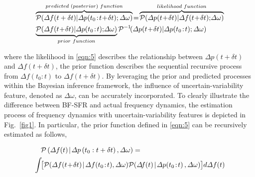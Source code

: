 \documentclass[lettersize,journal]{IEEEtran}
\newenvironment{newsubequations}{\small\begin{subequations}}{\end{subequations}}
\begin{document}
\vspace{-0.10in}
\begin{newsubequations}
	\begin{align}
		 & \overbrace{\mathcal{P}(\varDelta f(t+ \delta t)|\varDelta p(t_0\!:\! t \!+\! \delta t); \varDelta \omega)}^{{{predicted\,\, (posterior)}}\,\,function}\!=\!\overbrace{\mathcal{P}(\varDelta p(t\!+\!\delta t) | \varDelta f(t\!+\!\delta t); \!\varDelta\omega)}^{{{{{likelihood}}\,\, function}}} \notag          \\
		 & \underbrace{\mathcal{P}(\varDelta f(t\!+\! \delta t) | \varDelta p(t_0\!:\! t);\! \varDelta \omega)}_{{{{{prior}}\,\, function}}} { {\mathcal{P}^{-1}\!(\varDelta p(t\!+\!\delta t) | \varDelta p(t_0\!:\! t);\varDelta \omega)}}\label{eqn:5}
	\end{align}
\end{newsubequations}
\vspace{-0.125in}

\noindent where the {likelihood} in \eqref{eqn:5} describes the relationship between \(\varDelta p(t\!+\!\delta t)\) and \(\varDelta f(t\!+\!\delta t)\), the prior function describes the sequential recursive process from \(\varDelta f(t_0\!:\! t)\) to \(\varDelta f(t \!+\! \delta t)\). By leveraging the prior and predicted processes within the Bayesian inference framework, the influence of uncertain-variability feature, denoted as \(\varDelta \omega\), can be accurately incorporated. To clearly illustrate the difference between BF-SFR and actual frequency dynamics, the estimation process of frequency dynamics with uncertain-variability features is depicted in Fig.~\ref{fig1}. In particular, the prior function defined in \eqref{eqn:5} can be recursively estimated as follows,

\vspace{-0.125in}
\begin{newsubequations}
	\begin{align}
		 & \quad \mathcal{P}\left(\varDelta f(t) \!\mid\!  \varDelta p\left(t_{0}: t+\delta t \right), \varDelta \omega\right) = \label{eqn:6}                                                                                                                     \\
		 & \int\! \bigl[ \mathcal{P}(\varDelta f(t\!+\! \delta t) \!\mid\! \varDelta f(t_0\!:\! t), \varDelta \omega) \mathcal{P}\!\left(\varDelta \!f(t) \!\mid\!  \varDelta p\!\left(t_{0}\!: \! t\right), \varDelta \omega\right) \bigr] d\varDelta f(t) \notag
	\end{align}
\end{newsubequations}
\end{document}
